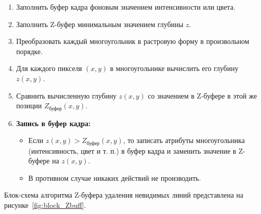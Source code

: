 \begin{enumerate}
    \item Заполнить буфер кадра фоновым значением интенсивности или цвета.
    
    \item Заполнить Z-буфер минимальным значением глубины \( z \).
    
    \item Преобразовать каждый многоугольник в растровую форму в произвольном порядке.
    
    \item Для каждого пикселя \( (x, y) \) в многоугольнике вычислить его глубину \( z(x, y) \).
    
    \item Сравнить вычисленную глубину \( z(x, y) \) со значением в Z-буфере в этой же позиции \( Z_{\text{буфер}}(x, y) \).
    
    \item \textbf{Запись в буфер кадра:}
    \begin{itemize}
        \item Если \( z(x, y) > Z_{\text{буфер}}(x, y) \), то записать атрибуты многоугольника (интенсивность, цвет и т. п.) в буфер кадра и заменить значение в Z-буфере на \( z(x, y) \).
        \item В противном случае никаких действий не производить.~\cite{rodgers}
    \end{itemize}
\end{enumerate}

Блок-схема алгоритма Z-буфера удаления невидимых линий представлена на рисунке~\ref{fig:block_Zbuff}.

